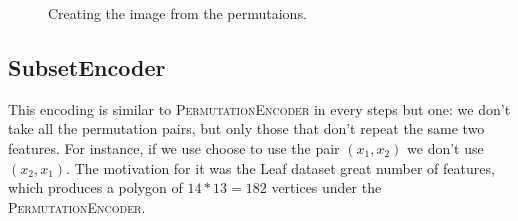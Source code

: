 \documentclass[11pt]{article}
\begin{document}
\begin{figure}[htp]
    \centering
    \qquad
    \caption{Creating the image from the permutaions.}
    \label{fig:P}
\end{figure}

\subsection{SubsetEncoder}
This encoding is similar to \textsc{PermutationEncoder} in every steps but one: we don't take all the permutation pairs, but only those that don't repeat the same two features. For instance, if we use choose to use the pair $(x_1,x_2)$ we don't use $(x_2,x_1)$. The motivation for it was the Leaf dataset great number of features, which produces a polygon of $14*13 = 182$ vertices under the \textsc{PermutationEncoder}.
\end{document}
